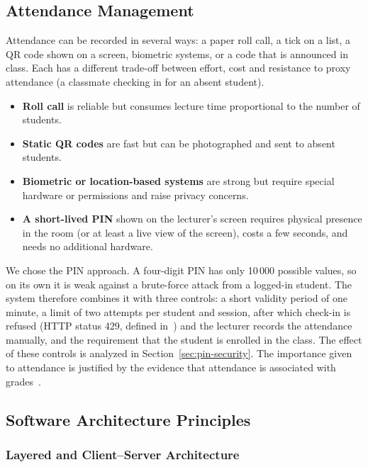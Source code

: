 \subsection{Attendance Management}

Attendance can be recorded in several ways: a paper roll call, a tick on a list, a QR code shown on a screen, biometric systems, or a code that is announced in class. Each has a different trade-off between effort, cost and resistance to proxy attendance (a classmate checking in for an absent student).

\begin{itemize}
    \item \textbf{Roll call} is reliable but consumes lecture time proportional to the number of students.
    \item \textbf{Static QR codes} are fast but can be photographed and sent to absent students.
    \item \textbf{Biometric or location-based systems} are strong but require special hardware or permissions and raise privacy concerns.
    \item \textbf{A short-lived PIN} shown on the lecturer's screen requires physical presence in the room (or at least a live view of the screen), costs a few seconds, and needs no additional hardware.
\end{itemize}

We chose the PIN approach. A four-digit PIN has only 10\,000 possible values, so on its own it is weak against a brute-force attack from a logged-in student. The system therefore combines it with three controls: a short validity period of one minute, a limit of two attempts per student and session, after which check-in is refused (HTTP status 429, defined in~\cite{rfc6585}) and the lecturer records the attendance manually, and the requirement that the student is enrolled in the class. The effect of these controls is analyzed in Section~\ref{sec:pin-security}. The importance given to attendance is justified by the evidence that attendance is associated with grades~\cite{crede2010class, kassarnig2018academic}.

\subsection{Software Architecture Principles}

\subsubsection{Layered and Client--Server Architecture}

